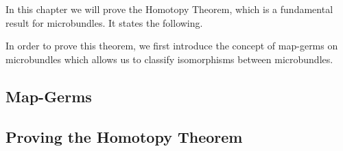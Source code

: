 \begin{myparagraph}
    In this chapter we will prove the Homotopy Theorem,
    which is a fundamental result for microbundles.
    It states the following.
\end{myparagraph}

\begin{myparagraph}
    In order to prove this theorem,
    we first introduce the concept of map-germs
    on microbundles which allows us to classify
    isomorphisms between microbundles.
\end{myparagraph}
\subsection*{Map-Germs}\label{section::germs}{\blankbreak}




\subsection*{Proving the Homotopy Theorem}\label{section::homotopy_prove}{\blankbreak}





